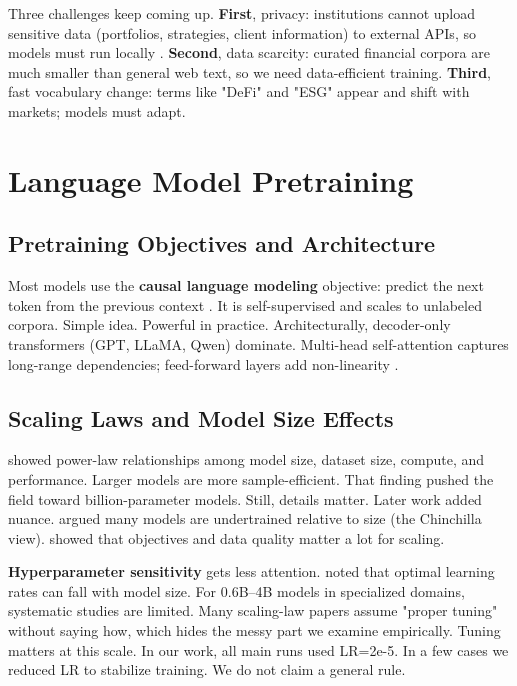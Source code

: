 Three challenges keep coming up. \textbf{First}, privacy: institutions cannot upload sensitive data (portfolios, strategies, client information) to external APIs, so models must run locally \parencite{wu2023bloomberggpt}. \textbf{Second}, data scarcity: curated financial corpora are much smaller than general web text, so we need data-efficient training. \textbf{Third}, fast vocabulary change: terms like "DeFi" and "ESG" appear and shift with markets; models must adapt.

\section{Language Model Pretraining}

\subsection{Pretraining Objectives and Architecture}

Most models use the \textbf{causal language modeling} objective: predict the next token from the previous context \parencite{radford2019language, brown2020language}. It is self-supervised and scales to unlabeled corpora. Simple idea. Powerful in practice. Architecturally, decoder-only transformers (GPT, LLaMA, Qwen) dominate. Multi-head self-attention captures long-range dependencies; feed-forward layers add non-linearity \parencite{vaswani2017attention, touvron2023llama}.

\subsection{Scaling Laws and Model Size Effects}

\textcite{kaplan2020scaling} showed power-law relationships among model size, dataset size, compute, and performance. Larger models are more sample-efficient. That finding pushed the field toward billion-parameter models. Still, details matter. Later work added nuance. \textcite{hoffmann2022training} argued many models are undertrained relative to size (the Chinchilla view). \textcite{tay2022ul2} showed that objectives and data quality matter a lot for scaling.

\textbf{Hyperparameter sensitivity} gets less attention. \textcite{mccandlish2018empirical} noted that optimal learning rates can fall with model size. For 0.6B--4B models in specialized domains, systematic studies are limited. Many scaling-law papers assume "proper tuning" without saying how, which hides the messy part we examine empirically. Tuning matters at this scale. In our work, all main runs used LR=2e-5. In a few cases we reduced LR to stabilize training. We do not claim a general rule.

